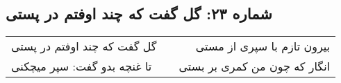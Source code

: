 \begin{center}
\section*{شماره ۲۳: گل گفت که چند اوفتم در پستی}
\label{sec:023}
\begin{longtable}{l p{0.5cm} r}
گل گفت که چند اوفتم در پستی
&&
بیرون تازم با سپری از مستی
\\
تا غنچه بدو گفت: سپر میچکنی
&&
انگار که چون من کمری بر بستی
\\
\end{longtable}
\end{center}
